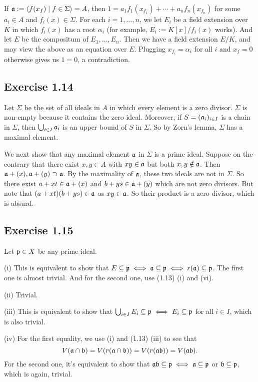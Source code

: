 \documentclass[../A&M.tex]{subfiles}
\begin{document}
If $\mathfrak{a}:=\langle f(x_f) \mid f\in\Sigma \rangle = A$, then $1=a_1f_1(x_{f_1})+\cdots+a_nf_n(x_{f_n})$ for some $a_i\in A$ and $f_i(x)\in\Sigma$. For each $i=1,\ldots,n$, we let $E_i$ be a field extension over $K$ in which $f_i(x)$ has a root $\alpha_i$ (for example, $E_i:=K[x]/f_i(x)$ works). And let $E$ be the compositum of $E_1,\ldots,E_n$. Then we have a field extension $E/K$, and may view the above as an equation over $E$. Plugging $x_{f_i} = \alpha_i$ for all $i$ and $x_f=0$ otherwise gives us $1=0$, a contradiction.

\subsection*{Exercise 1.14}

Let $\Sigma$ be the set of all ideals in $A$ in which every element is a zero divisor. $\Sigma$ is non-empty because it contains the zero ideal. Moreover, if $S=(\mathfrak{a}_i)_{i\in I}$ is a chain in $\Sigma$, then $\bigcup_{i\in I} \mathfrak{a}_i$ is an upper bound of $S$ in $\Sigma$. So by Zorn's lemma, $\Sigma$ has a maximal element.

We next show that any maximal element $\mathfrak{a}$ in $\Sigma$ is a prime ideal. Suppose on the contrary that there exist $x,y\in A$ with $xy\in\mathfrak{a}$ but both $x,y\notin\mathfrak{a}$. Then $\mathfrak{a}+(x),\mathfrak{a}+(y) \supset \mathfrak{a}$. By the maximality of $\mathfrak{a}$, these two ideals are not in $\Sigma$. So there exist $a+xt\in\mathfrak{a}+(x)$ and $b+ys\in\mathfrak{a}+(y)$ which are not zero divisors. But note that $(a+xt)(b+ys) \in \mathfrak{a}$ as $xy\in\mathfrak{a}$. So their product is a zero divisor, which is absurd.

\subsection*{Exercise 1.15}

Let $\mathfrak{p}\in X$ be any prime ideal.

(i) This is equivalent to show that $E \subseteq \mathfrak{p} \iff \mathfrak{a} \subseteq \mathfrak{p} \iff r(\mathfrak{a}) \subseteq \mathfrak{p}$. The first one is almost trivial. And for the second one, use (1.13) (i) and (vi).

(ii) Trivial.

(iii) This is equivalent to show that $\bigcup_{i\in I} E_i \subseteq \mathfrak{p} \iff E_i \subseteq \mathfrak{p}$ for all $i\in I$, which is also trivial.

(iv) For the first equality, we use (i) and (1.13) (iii) to see that
$$
V(\mathfrak{a} \cap \mathfrak{b}) = V(r(\mathfrak{a} \cap \mathfrak{b})) =  V(r(\mathfrak{a}\mathfrak{b})) = V(\mathfrak{a}\mathfrak{b}).
$$
For the second one, it's equivalent to show that $\mathfrak{a}\mathfrak{b} \subseteq \mathfrak{p} \iff \mathfrak{a} \subseteq \mathfrak{p}$ or $\mathfrak{b} \subseteq \mathfrak{p}$, which is again, trivial.
\end{document}
